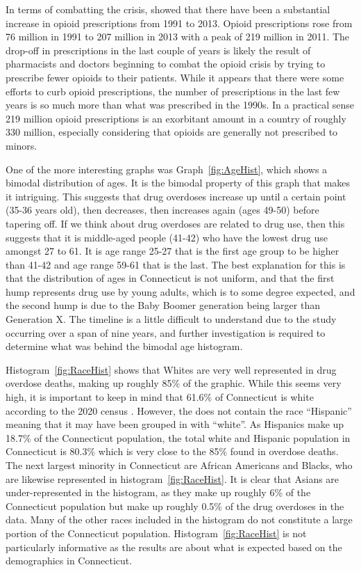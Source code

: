 \documentclass[12pt, letterpaper, titlepage]{article}
\begin{document}
In terms of combatting the crisis, \citet{tran_2022} showed that there have been a substantial increase in opioid prescriptions from 1991 to 2013.  Opioid prescriptions rose from 76 million in 1991 to 207 million in 2013 with a peak of 219 million in 2011.  The drop-off in prescriptions in the last couple of years is likely the result of pharmacists and doctors beginning to combat the opioid crisis by trying to prescribe fewer opioids to their patients.  While it appears that there were some efforts to curb opioid prescriptions, the number of prescriptions in the last few years is so much more than what was prescribed in the 1990s.  In a practical sense 219 million opioid prescriptions is an exorbitant amount in a country of roughly 330 million, especially considering that opioids are generally not prescribed to minors.  

One of the more interesting graphs was Graph~\ref{fig:AgeHist}, which shows a bimodal distribution of ages.  It is the bimodal property of this graph that makes it intriguing.  This suggests that drug overdoses increase up until a certain point (35-36 years old), then decreases, then increases again (ages 49-50) before tapering off.  If we think about drug overdoses are related to drug use, then this suggests that it is middle-aged people (41-42) who have the lowest drug use amongst 27 to 61.  It is age range 25-27 that is the first age group to be higher than 41-42 and age range 59-61 that is the last.  The best explanation for this is that the distribution of ages in Connecticut is not uniform, and that the first hump represents drug use by young adults, which is to some degree expected, and the second hump is due to the Baby Boomer generation being larger than Generation X.  The timeline is a little difficult to understand due to the study occurring over a span of nine years, and further investigation is required to determine what was behind the bimodal age histogram.

Histogram~\ref{fig:RaceHist} shows that Whites are very well represented in drug overdose deaths, making up roughly 85\% of the graphic.  While this seems very high, it is important to keep in mind that 61.6\% of Connecticut is white according to the 2020 census \citep{acf2023}.  However, the \citet{data} does not contain the race ``Hispanic'' meaning that it may have been grouped in with ``white''.  As Hispanics make up 18.7\% of the Connecticut population, the total white and Hispanic population in Connecticut is 80.3\% which is very close to the 85\% found in overdose deaths.  The next largest minority in Connecticut are African Americans and Blacks, who are likewise represented in histogram~\ref{fig:RaceHist}.  It is clear that Asians are under-represented in the histogram, as they make up roughly 6\% of the Connecticut population but make up roughly 0.5\% of the drug overdoses in the data. Many of the other races included in the histogram do not constitute a large portion of the Connecticut population.  Histogram~\ref{fig:RaceHist} is not particularly informative as the results are about what is expected based on the demographics in Connecticut.
\end{document}
